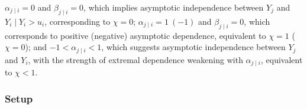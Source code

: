 \documentclass[12pt]{article}
\begin{document}
$\alpha_{j\mid i}=0$ and $\beta_{j\mid i}=0$, which implies asymptotic independence between $Y_j$ and $Y_i\mid Y_i>u_i$, corresponding to $\chi=0$;
$\alpha_{j\mid i}=1\ ( -1)$ and $\beta_{j\mid i}=0$, which corresponds to positive (negative) asymptotic dependence, equivalent to $\chi=1$ ($\chi=0$); and
$-1<\alpha_{j\mid i}<1$, which suggests asymptotic independence between $Y_j$ and $Y_i$, with the strength of extremal dependence weakening with $\alpha_{j \mid i}$, equivalent to $\chi<1$.

\subsubsection{Setup}~\label{subsubsec:ce_setup}
\end{document}
